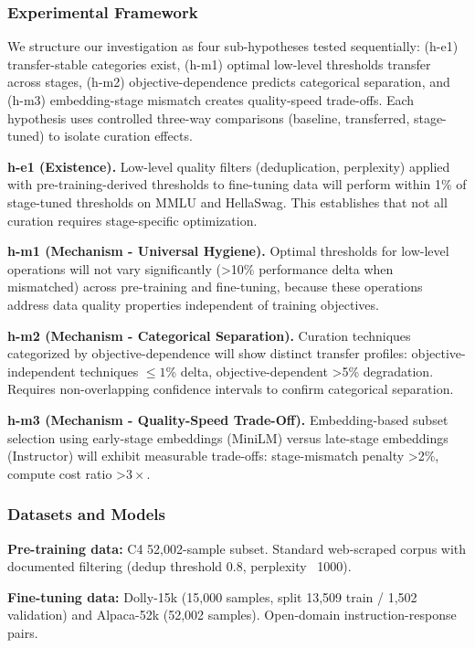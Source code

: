 
\subsubsection{Experimental Framework}

We structure our investigation as four sub-hypotheses tested sequentially: (h-e1) transfer-stable categories exist, (h-m1) optimal low-level thresholds transfer across stages, (h-m2) objective-dependence predicts categorical separation, and (h-m3) embedding-stage mismatch creates quality-speed trade-offs. Each hypothesis uses controlled three-way comparisons (baseline, transferred, stage-tuned) to isolate curation effects.

\textbf{h-e1 (Existence).} Low-level quality filters (deduplication, perplexity) applied with pre-training-derived thresholds to fine-tuning data will perform within 1\% of stage-tuned thresholds on MMLU and HellaSwag. This establishes that not all curation requires stage-specific optimization.

\textbf{h-m1 (Mechanism - Universal Hygiene).} Optimal thresholds for low-level operations will not vary significantly (>10\% performance delta when mismatched) across pre-training and fine-tuning, because these operations address data quality properties independent of training objectives.

\textbf{h-m2 (Mechanism - Categorical Separation).} Curation techniques categorized by objective-dependence will show distinct transfer profiles: objective-independent techniques $\leq 1$\% delta, objective-dependent >5\% degradation. Requires non-overlapping confidence intervals to confirm categorical separation.

\textbf{h-m3 (Mechanism - Quality-Speed Trade-Off).} Embedding-based subset selection using early-stage embeddings (MiniLM) versus late-stage embeddings (Instructor) will exhibit measurable trade-offs: stage-mismatch penalty >2\%, compute cost ratio >$3\times$.

\subsubsection{Datasets and Models}

\textbf{Pre-training data:} C4 52,002-sample subset. Standard web-scraped corpus with documented filtering (dedup threshold 0.8, perplexity ~1000).

\textbf{Fine-tuning data:} Dolly-15k (15,000 samples, split 13,509 train / 1,502 validation) and Alpaca-52k (52,002 samples). Open-domain instruction-response pairs.

